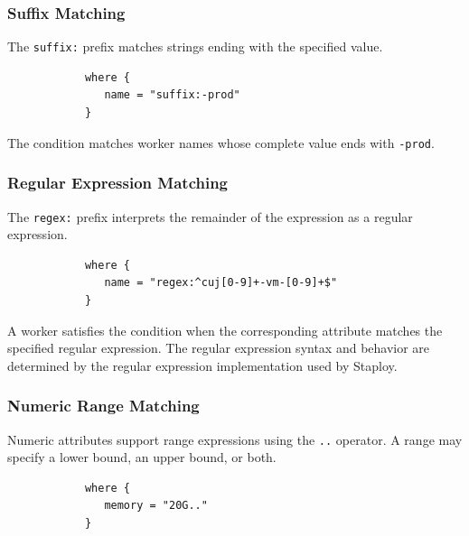 \documentclass[11pt,a4paper]{article}
\begin{document}
    \subsubsection{Suffix Matching}

    The \texttt{suffix:} prefix matches strings ending with the specified value.

    \begin{center}
        \begin{verbatim}
            where {
               name = "suffix:-prod"
            }
        \end{verbatim}
    \end{center}

    The condition matches worker names whose complete value ends with \texttt{-prod}.

    \subsubsection{Regular Expression Matching}

    The \texttt{regex:} prefix interprets the remainder of the expression as a regular expression.

    \begin{center}
        \begin{verbatim}
            where {
               name = "regex:^cuj[0-9]+-vm-[0-9]+$"
            }
        \end{verbatim}
    \end{center}

    A worker satisfies the condition when the corresponding attribute matches the specified regular expression.
    The regular expression syntax and behavior are determined by the regular expression implementation used by Staploy.

    \subsubsection{Numeric Range Matching}

    Numeric attributes support range expressions using the \texttt{\string.\string.} operator.
    A range may specify a lower bound, an upper bound, or both.

    \begin{center}
        \begin{verbatim}
            where {
               memory = "20G.."
            }
        \end{verbatim}
    \end{center}
\end{document}
